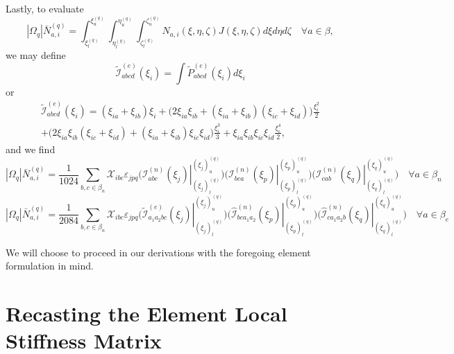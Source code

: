 \documentclass[11pt]{article} %
\begin{document}
Lastly, to evaluate
\begin{equation}
	| \Omega_q | \bar{N}_{a,i}^{(q)} = \int_{\xi^{(q)}_{l}}^{\xi^{(q)}_{u}} \int_{\eta^{(q)}_{l}}^{\eta^{(q)}_{u}} \int_{\zeta^{(q)}_{l}}^{\zeta^{(q)}_{u}} N_{a,i} ( \xi, \eta, \zeta ) J( \xi, \eta, \zeta ) d \xi d \eta d \zeta \quad \forall a \in \beta,
\end{equation}
we may define
\begin{equation}
	\tilde{\mathcal{I}}^{(e)}_{abcd} (\xi_i) = \int \tilde{P}^{(e)}_{abcd} (\xi_i) d \xi_i
\end{equation}
or
\begin{eqnarray}
	\tilde{\mathcal{I}}^{(e)}_{abcd} (\xi_i) = (\xi_{ia} + \xi_{ib}) \xi_i + \bigg( 2 \xi_{ia} \xi_{ib} + (\xi_{ia} + \xi_{ib}) (\xi_{ic} + \xi_{id}) \bigg) \frac{\xi_i^2}{2} \nonumber \\ + \bigg( 2 \xi_{ia} \xi_{ib} (\xi_{ic} + \xi_{id}) + (\xi_{ia} + \xi_{ib}) \xi_{ic} \xi_{id} \bigg) \frac{\xi_i^3}{3} + \xi_{ia} \xi_{ib} \xi_{ic} \xi_{id} \frac{\xi_i^4}{2},
\end{eqnarray}
and we find
\begin{equation}
	| \Omega_q | \bar{N}_{a,i}^{(q)} = \frac{1}{1024} \sum_{b, c \in \beta_n} \mathcal{X}_{ibc} \varepsilon_{jpq} \bigg( \left. \mathcal{I}^{(n)}_{abc} (\xi_j) \right|^{(\xi_j)^{(q)}_{u}}_{(\xi_j)^{(q)}_{l}} \bigg) \bigg( \left. \mathcal{I}^{(n)}_{bca} (\xi_p) \right|^{(\xi_p)^{(q)}_{u}}_{(\xi_p)^{(q)}_{l}} \bigg) \bigg( \left. \mathcal{I}^{(n)}_{cab} (\xi_q) \right|^{(\xi_q)^{(q)}_{u}}_{(\xi_q)^{(q)}_{l}} \bigg) \quad \forall a \in \beta_n
\end{equation}
\begin{equation}
	| \Omega_q | \bar{N}_{a,i}^{(q)} = \frac{1}{2084} \sum_{b, c \in \beta_n} \mathcal{X}_{ibc} \varepsilon_{jpq} \bigg( \left. \tilde{\mathcal{I}}^{(e)}_{a_1a_2bc} (\xi_j) \right|^{(\xi_j)^{(q)}_{u}}_{(\xi_j)^{(q)}_{l}} \bigg) \bigg( \left. \hat{\mathcal{I}}^{(n)}_{bca_1a_2} (\xi_p) \right|^{(\xi_p)^{(q)}_{u}}_{(\xi_p)^{(q)}_{l}} \bigg) \bigg( \left. \hat{\mathcal{I}}^{(n)}_{ca_1a_2b} (\xi_q) \right|^{(\xi_q)^{(q)}_{u}}_{(\xi_q)^{(q)}_{l}} \bigg) \quad \forall a \in \beta_e
\end{equation}

We will choose to proceed in our derivations with the foregoing element formulation in mind. 

\section{Recasting the Element Local Stiffness Matrix}
\end{document}
